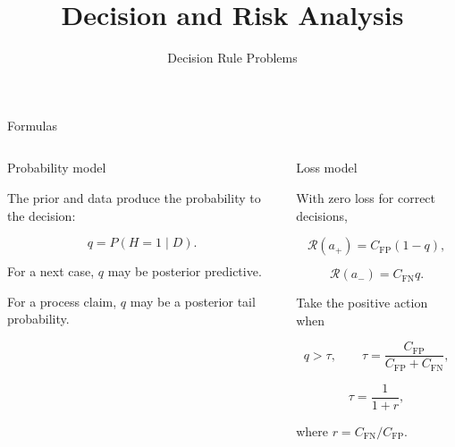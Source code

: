 \documentclass[aspectratio=43,10pt]{beamer}
\title{Decision and Risk Analysis}
\subtitle{Decision Rule Problems}
\author{\emph{}}
\date{
  \color{aggiemaroon}{
    DAEN 427 / ISEN 427 / ISEN 627\\
    \textbf{Alexander Abuabara}\\
    Fall 2026
  }
}
\newcommand{\CFP}{C_{\mathrm{FP}}}
\newcommand{\CFN}{C_{\mathrm{FN}}}
\newcommand{\Risk}{\mathcal{R}}
\begin{document}

\maketitle


\begin{frame}{Formulas}

  \begin{columns}[T,onlytextwidth]


    \begin{block}{Probability model}

      The prior and data produce the probability to the decision:

      \[
      q=P(H=1\mid D).
      \]

      For a next case, $q$ may be posterior predictive.

      For a process claim, $q$ may be a posterior tail probability.

    \end{block}


    \begin{block}{Loss model}

      With zero loss for correct decisions,

      \[
      \Risk(a_+)=\CFP(1-q),
      \]

      \[
      \Risk(a_-)=\CFN q.
      \]

      Take the positive action when

      \[
      q>\tau,
      \qquad
      \tau=\frac{\CFP}{\CFP+\CFN},
      \]

      \[
      \tau=\frac{1}{1+r},
      \]

      where $r=\CFN/\CFP$.

    \end{block}

  \end{columns}

\end{frame}

\end{document}
